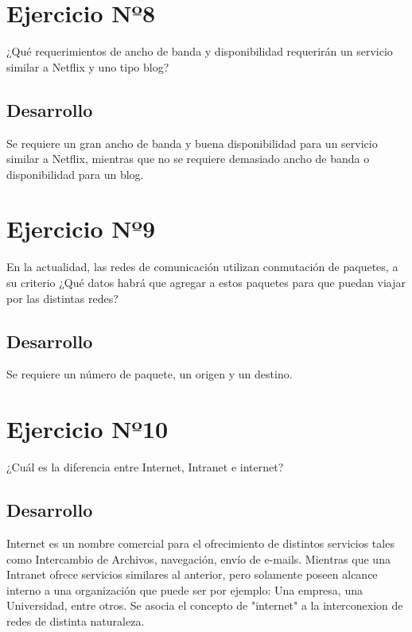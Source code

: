 \documentclass[12pt,letterpaper]{article}
\begin{document}
\section{Ejercicio Nº8}
¿Qué requerimientos de ancho de banda y disponibilidad requerirán un servicio similar a Netflix y uno tipo blog?
\subsection{Desarrollo}
Se requiere un gran ancho de banda y buena disponibilidad para un servicio similar a Netflix, mientras que no se requiere demasiado ancho de banda o disponibilidad para un blog.
\section{Ejercicio Nº9}
En la actualidad, las redes de comunicación utilizan conmutación de paquetes, a su criterio
¿Qué datos habrá que agregar a estos paquetes para que puedan viajar por las distintas
redes?
\subsection{Desarrollo}
Se requiere un número de paquete, un origen y un destino.
\section{Ejercicio Nº10}
¿Cuál es la diferencia entre Internet, Intranet e internet?
\subsection{Desarrollo}
Internet es un nombre comercial para el ofrecimiento de distintos servicios tales como Intercambio de Archivos, navegación, envío de e-mails.
Mientras que una Intranet ofrece servicios similares al anterior, pero solamente poseen alcance interno a una organización que puede ser por ejemplo: Una empresa, una Universidad, entre otros.
Se asocia el concepto de "internet" a la interconexion de redes de distinta naturaleza.
\end{document}
